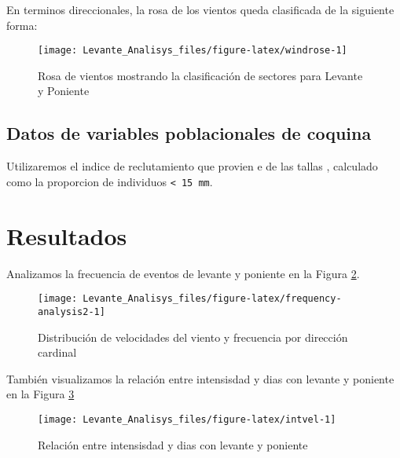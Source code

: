 \documentclass[
]{article}
\begin{document}
En terminos direccionales, la rosa de los vientos queda clasificada de la siguiente forma:

\begin{figure}

{\centering \texttt{[image: Levante\_Analisys\_files/figure-latex/windrose-1]} 

}

\caption{Rosa de vientos mostrando la clasificación de sectores para Levante y Poniente}\label{fig:windrose}
\end{figure}

\subsection{Datos de variables poblacionales de coquina}\label{datos-de-variables-poblacionales-de-coquina}

Utilizaremos el indice de reclutamiento que provien e de las tallas , calculado como la proporcion de individuos \texttt{\textless{}\ 15\ mm}.

\newpage

\section{Resultados}\label{resultados}

Analizamos la frecuencia de eventos de levante y poniente en la Figura \ref{fig:frequency-analysis2}.

\begin{figure}

{\centering \texttt{[image: Levante\_Analisys\_files/figure-latex/frequency-analysis2-1]} 

}

\caption{Distribución de velocidades del viento y frecuencia por dirección cardinal}\label{fig:frequency-analysis2}
\end{figure}

\newpage

También visualizamos la relación entre intensisdad y dias con levante y poniente en la Figura \ref{fig:intvel}

\begin{figure}

{\centering \texttt{[image: Levante\_Analisys\_files/figure-latex/intvel-1]} 

}

\caption{Relación entre intensisdad y dias con levante y poniente}\label{fig:intvel}
\end{figure}
\end{document}
